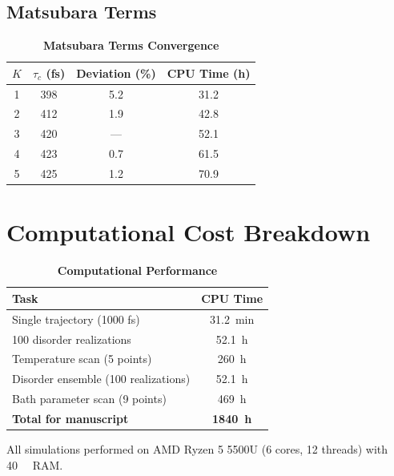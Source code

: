 \documentclass[11pt,a4paper]{article}
\begin{document}
\subsection{Matsubara Terms}

\begin{table}[h]
\centering
\caption{\textbf{Matsubara Terms Convergence}}
\label{tab:SI_matsubara}
\begin{tabular}{cccc}
\toprule
\textbf{$K$} & \textbf{$\tau_c$ (fs)} & \textbf{Deviation (\%)} & \textbf{CPU Time (h)} \\
\midrule
1 & 398 & 5.2 & 31.2 \\
2 & 412 & 1.9 & 42.8 \\
3 & 420 & --- & 52.1 \\
4 & 423 & 0.7 & 61.5 \\
5 & 425 & 1.2 & 70.9 \\
\bottomrule
\end{tabular}
\end{table}


\section{Computational Cost Breakdown}

\begin{table}[h]
\centering
\caption{\textbf{Computational Performance}}
\label{tab:SI_performance}
\begin{tabular}{lc}
\toprule
\textbf{Task} & \textbf{CPU Time} \\
\midrule
Single trajectory (1000 fs) & \SI{31.2}{\minute} \\
100 disorder realizations & \SI{52.1}{\hour} \\
Temperature scan (5 points) & \SI{260}{\hour} \\
Disorder ensemble (100 realizations) & \SI{52.1}{\hour} \\
Bath parameter scan (9 points) & \SI{469}{\hour} \\
\midrule
\textbf{Total for manuscript} & \textbf{\SI{1840}{\hour}} \\
\bottomrule
\end{tabular}
\end{table}

All simulations performed on AMD Ryzen 5 5500U (6 cores, 12 threads) with \SI{40}{\giga\byte} RAM.
\end{document}

